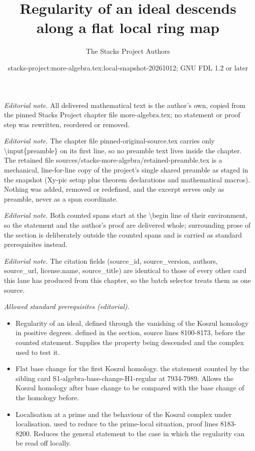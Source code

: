 \documentclass[10pt,a4paper]{amsart}
\title{Regularity of an ideal descends along a flat local ring map}
\author{The Stacks Project Authors}
\date{stacks-project:more-algebra.tex:local-snapshot-20261012; GNU FDL 1.2 or later}
\theoremstyle{plain}
\theoremstyle{definition}
\theoremstyle{remark}
\numberwithin{equation}{subsection}
\begin{document}
\maketitle
\setcounter{subsection}{1}
\noindent\textit{Editorial note.} All delivered mathematical text is the author's own, copied from the pinned Stacks Project chapter file more-algebra.tex; no statement or proof step was rewritten, reordered or removed.\par\medskip
\noindent\textit{Editorial note.} The chapter file pinned-original-source.tex carries only \textbackslash{}input\{preamble\} on its first line, so no preamble text lives inside the chapter. The retained file sources/stacks-more-algebra/retained-preamble.tex is a mechanical, line-for-line copy of the project's single shared preamble as staged in the snapshot (Xy-pic setup plus theorem declarations and mathematical macros). Nothing was added, removed or redefined, and the excerpt serves only as preamble, never as a span coordinate.\par\medskip
\noindent\textit{Editorial note.} Both counted spans start at the \textbackslash{}begin line of their environment, so the statement and the author's proof are delivered whole; surrounding prose of the section is deliberately outside the counted spans and is carried as standard prerequisites instead.\par\medskip
\noindent\textit{Editorial note.} The citation fields (source\_id, source\_version, authors, source\_url, license.name, source\_title) are identical to those of every other card this lane has produced from this chapter, so the batch selector treats them as one source.\par\medskip
\noindent\textit{Allowed standard prerequisites (editorial).}\begin{itemize}
\item Regularity of an ideal, defined through the vanishing of the Koszul homology in positive degrees. defined in the section, source lines 8100-8173, before the counted statement. Supplies the property being descended and the complex used to test it.
\item Flat base change for the first Koszul homology. the statement counted by the sibling card S1-algebra-base-change-H1-regular at 7934-7989. Allows the Koszul homology after base change to be compared with the base change of the homology before.
\item Localisation at a prime and the behaviour of the Koszul complex under localisation. used to reduce to the prime-local situation, proof lines 8183-8200. Reduces the general statement to the case in which the regularity can be read off locally.
\end{itemize}\medskip
\end{document}
